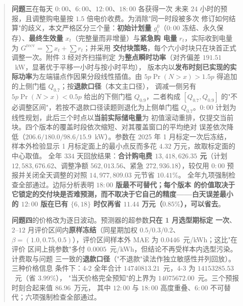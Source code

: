 \documentclass[withoutpreface,bwprint]{cumcmthesis}
\begin{document}
\begin{abstract}
\textbf{问题三}在每天 $0{:}00$、$6{:}00$、$12{:}00$、$18{:}00$ 各获得一次
未来 $24$ 小时的预报，且调整购电量按 $1.5$ 倍电价收费。为消除"同一时段被多次
修订如何结算"的歧义，本文严格区分三个量：\textbf{初始计划量} $g_t^0$（$0{:}00$
冻结、永久保存）、\textbf{最终生效量} $x_t$（完整量而非增量）与\textbf{紧急购
电量} $r_t$，实际收到电量为 $G^{\mathrm{recv}}=\sum x_t+\sum r_t$；并采用
\textbf{交付块策略}，每个六小时块只在块首正式调整一次。附件 3 经对齐扫描判定
为\textbf{整点瞬时功率}（对齐偏差 $191.51$~kW，显著优于平移一小时与按小时平均），
版本内以\textbf{发布时刻已实现的实际功率}为左端锚点作因果分段线性插值。由
$5p\Pr(N>x)>1.5p$ 得追加的上侧门槛 $Q_{0.7}$；按\textbf{退款口径}（本文主口径），
调减一侧另有 $5p\Pr(N>x)<0.5p$ 给出的下侧门槛 $Q_{0.9}$，二者构成
$[Q_{0.7},Q_{0.9}]$ 的"不必调整区间"，若按不退款口径读题则退化为上侧单门槛
$Q_{0.7}$。$0{:}00$ 计划为线性规划，此后三个时点以\textbf{当前实际储电量}为
初值滚动重排，仅提交当前块。四个版本的覆盖时段依次缩短、对其覆盖窗口的平均绝对
误差依次降低（$206.6/180.0/98.6/15.9$~kW）。参数在 2025 年 1 月标定一次后冻结，
样本外检验显示 1 月标定面上的最小点反而多花 $4.32$ 万元，故取标定面的中心取值。
全年 $334$ 天回放结果：\textbf{合计购电费 $13{,}418{,}626.35$ 元}（计划
$12{,}583{,}676.62$、调整净额 $562{,}013.56$、紧急 $272{,}936.18$），较仅用
$0{:}00$ 预报并关闭全天调整的对照 $14{,}977{,}809.03$ 元节省 $10.41\%$。
全年九项强制检查全部通过。边际分析表明 \textbf{$18{:}00$ 版最不可替代；每个版本
的价值取决于它锁定的交付块是否难预测，而不取决于它自己的精度——白天误差最小的
$12{:}00$ 版在已有 $\{6,18\}$ 时仅再省 $11.44$ 万元（$0.85\%$），可以省去}。

\textbf{问题四}的价格改为逐日波动。预测器的超参数\textbf{只在 1 月选型期标定
一次}、$2$--$12$ 月评价区间内\textbf{原样冻结}（同星期加权 $0.5/0.3/0.2$、
$\beta=(1.0,0.75,0.5)$），评价区间样本外 MAE 为 $0.0446$~元/kWh；这比"在评价
区间上挑参数"多付 $0.0005$~元/kWh，但结论不再受样本内选型污染。计费取与问题
三一致的\textbf{退款口径}（"不退款"读法作独立敏感性并列回放）。三种价格信息
条件下：4-2 全年合计 $14740813.21$~元，4-3 为 $14153285.53$~元（省 $3.99\%$），
"当天价格完全预知"的上界为 $14075672.00$~元。三个预报时刻合起来值 $86.96$~万元，
其中 $12{:}00$ 与 $18{:}00$ 高度重叠、$6{:}00$ 不可替代；六项强制检查全部通过。

\end{abstract}

\end{document}
